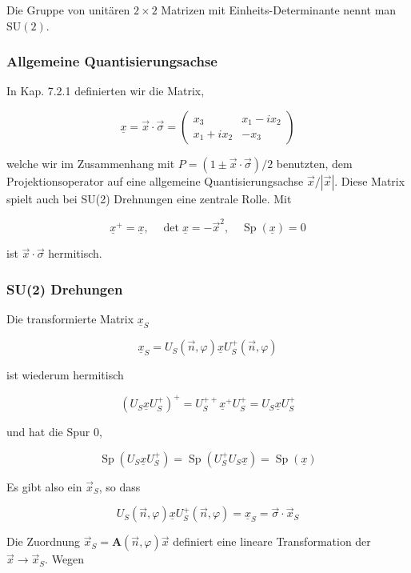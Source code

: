 \documentclass[10pt, letterpaper]{article}
\begin{document}
Die Gruppe von unitären $2 \times 2$ Matrizen mit Einheits-Determinante nennt man $\mathrm{SU}(2)$.

\subsubsection*{Allgemeine Quantisierungsachse}
In Kap. 7.2.1 definierten wir die Matrix,

$$
\underline{x}=\vec{x} \cdot \vec{\sigma}=\left(\begin{array}{cc}
x_{3} & x_{1}-i x_{2} \\
x_{1}+i x_{2} & -x_{3}
\end{array}\right)
$$

welche wir im Zusammenhang mit $P=(1 \pm \vec{x} \cdot \vec{\sigma}) / 2$ benutzten, dem Projektionsoperator auf eine allgemeine Quantisierungsachse $\vec{x} /|\vec{x}|$. Diese Matrix spielt auch bei SU(2) Drehnungen eine zentrale Rolle. Mit

$$
\underline{x}^{+}=\underline{x}, \quad \operatorname{det} \underline{x}=-\vec{x}^{2}, \quad \operatorname{Sp}(\underline{x})=0
$$

ist $\vec{x} \cdot \vec{\sigma}$ hermitisch.

\subsubsection*{SU(2) Drehungen}
Die transformierte Matrix $\underline{x}_{S}$

$$
\underline{x}_{S}=U_{S}(\vec{n}, \varphi) \underline{x} U_{S}^{+}(\vec{n}, \varphi)
$$

ist wiederum hermitisch

$$
\left(U_{S} \underline{x} U_{S}^{+}\right)^{+}=U_{S}^{++} \underline{x}^{+} U_{S}^{+}=U_{S} \underline{x} U_{S}^{+}
$$

und hat die Spur 0,

$$
\operatorname{Sp}\left(U_{S} \underline{x} U_{S}^{+}\right)=\operatorname{Sp}\left(U_{S}^{+} U_{S} \underline{x}\right)=\operatorname{Sp}(\underline{x})
$$

Es gibt also ein $\vec{x}_{S}$, so dass

$$
U_{S}(\vec{n}, \varphi) \underline{x} U_{S}^{+}(\vec{n}, \varphi)=\underline{x}_{S}=\vec{\sigma} \cdot \vec{x}_{S}
$$

Die Zuordnung $\vec{x}_{S}=\mathbf{A}(\vec{n}, \varphi) \vec{x}$ definiert eine lineare Transformation der $\vec{x} \rightarrow \vec{x}_{S}$. Wegen
\end{document}

